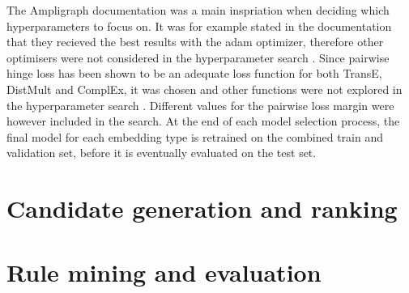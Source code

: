 The Ampligraph documentation was a main inspriation when deciding which hyperparameters to focus on. It was for example stated in the documentation that they recieved the best results with the adam optimizer, therefore other optimisers were not considered in the hyperparameter search \cite{ampligraph_documentation}. Since pairwise hinge loss has been shown to be an adequate loss function for both TransE, DistMult and ComplEx, it was chosen and other functions were not explored in the hyperparameter search \cite{mohamed2019loss}. Different values for the  pairwise loss margin were however included in the search. At the end of each model selection process, the final model for each embedding type is retrained on the combined train and validation set, before it is eventually evaluated on the test set.









\section{Candidate generation and ranking}



\section{Rule mining and evaluation}
